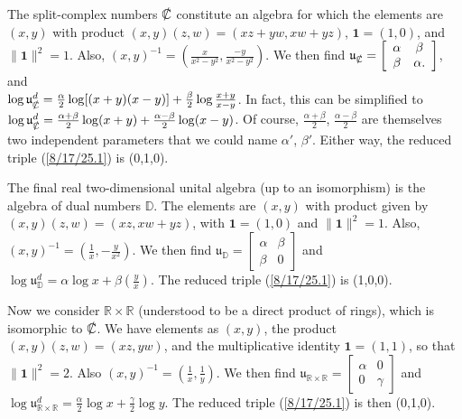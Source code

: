 \documentclass{amsart}
\theoremstyle{definition}
\numberwithin{theorem}{section}
\numberwithin{equation}{section}
\begin{document}
The split-complex numbers $\slashed{\mathbb{C}}$ constitute an algebra for which the elements are  $(x,y)$ with product $(x,y)(z,w) = (xz+yw,xw+yz)$, $ \mathbf{1} = (1,0)$, and $\|\mathbf{1}\|^2 = 1$.  Also, $(x,y)^{-1} = (\frac{x}{x^2-y^2},\frac{-y}{x^2-y^2})$. \hspace{1cm}  We then find $\mathfrak{u}_{\slashed{\mathbb{C}}} = \left[\begin{array}{ccc}
 \alpha & \beta   \\ 
 \beta & \alpha.    
\end{array}\right]$, \hspace{.5cm} and \hfill \\ $\log  \mathfrak{u}^d_{\slashed{\mathbb{C}}} = \frac{\alpha}{2}\log[(x+
y)(x-y)] +  \frac{\beta}{2}\log \frac{x+y}{x-y}$.  In fact, this can be simplified to $\log  \mathfrak{u}^d_{\slashed{\mathbb{C}}} = \frac{\alpha+\beta}{2}\log(x+y) + \frac{\alpha-\beta}{2}\log(x-y)$.  Of course, $\frac{\alpha+\beta}{2}$, $\frac{\alpha-\beta}{2}$ are themselves two independent parameters that we could name $\alpha'$, $\beta'$.  Either way, the reduced triple (\ref{8/17/25.1}) is (0,1,0).

The final real two-dimensional unital algebra (up to an isomorphism) is the algebra of dual numbers $\mathbb{D}$.  The elements are $(x,y)$ with product given by $(x,y)(z,w) = (xz,xw+yz)$, with $\mathbf{1}=(1,0)$ and $\|\mathbf{1}\|^2 = 1$. Also, $(x,y)^{-1} = (\frac{1}{x},-\frac{y}{x^2})$.  We then find $\mathfrak{u}_\mathbb{D} = \left[\begin{array}{ccc}
 \alpha & \beta   \\ 
 \beta & 0    
\end{array}\right]$ and $\log  \mathfrak{u}^d_{\mathbb{D}} = \alpha\log x + \beta\left(\frac{y}{x}\right)$.  The reduced triple (\ref{8/17/25.1}) is (1,0,0).

   Now we consider $\mathbb{R}\times\mathbb{R}$ (understood to be a direct product of rings), which is isomorphic to $\slashed{\mathbb{C}}$.  We have elements as $(x,y)$, the product $(x,y)(z,w) = (xz,yw)$, and the multiplicative identity $\mathbf{1}=(1,1)$, so that $\|\mathbf{1}\|^2 = 2$.  Also $(x,y)^{-1} = (\frac{1}{x},\frac{1}{y})$.  We then find $\mathfrak{u}_{\mathbb{R}\times\mathbb{R}} = \left[\begin{array}{ccc}
 \alpha & 0   \\ 
 0 & \gamma    
\end{array}\right]$ and $\log  \mathfrak{u}^d_{\mathbb{R}\times\mathbb{R}} = \frac{\alpha}{2}\log x + \frac{\gamma}{2}\log y$.  The reduced triple (\ref{8/17/25.1}) is then (0,1,0).
\end{document}
